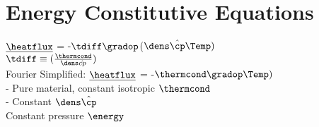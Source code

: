 \section{Energy Constitutive Equations}

\begin{mdframed}
   
     $\underline{\heatflux}$ = -$\tdiff\gradop$($\dens\hat{\cp}\Temp)$ \\
    
     $\tdiff \equiv (\frac{\thermcond}{\dens\hat{cp}})$\\
    
    Fourier Simplified: $\underline{\heatflux}$ = -$\thermcond\gradop\Temp)$\\
    - Pure material, constant isotropic $\thermcond$\\
    - Constant $\dens\hat{\cp}$\\
    Constant pressure 
    $\energy$
    
\end{mdframed}